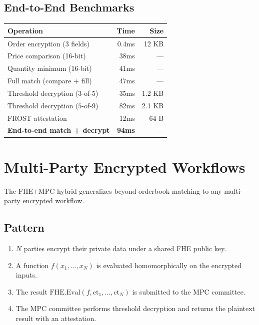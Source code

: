 \documentclass[11pt,a4paper]{article}
\begin{document}
\subsection{End-to-End Benchmarks}

\begin{center}
\begin{tabular}{lrr}
\toprule
\textbf{Operation} & \textbf{Time} & \textbf{Size} \\
\midrule
Order encryption (3 fields) & 0.4ms & 12 KB \\
Price comparison (16-bit) & 38ms & --- \\
Quantity minimum (16-bit) & 41ms & --- \\
Full match (compare + fill) & 47ms & --- \\
Threshold decryption ($3$-of-$5$) & 35ms & 1.2 KB \\
Threshold decryption ($5$-of-$9$) & 82ms & 2.1 KB \\
FROST attestation & 12ms & 64 B \\
\midrule
\textbf{End-to-end match + decrypt} & \textbf{94ms} & --- \\
\bottomrule
\end{tabular}
\end{center}

\section{Multi-Party Encrypted Workflows}

The FHE+MPC hybrid generalizes beyond orderbook matching to any multi-party encrypted workflow.

\subsection{Pattern}

\begin{enumerate}[leftmargin=2em]
\item $N$ parties encrypt their private data under a shared FHE public key.
\item A function $f(x_1, \ldots, x_N)$ is evaluated homomorphically on the encrypted inputs.
\item The result $\text{FHE.Eval}(f, \text{ct}_1, \ldots, \text{ct}_N)$ is submitted to the MPC committee.
\item The MPC committee performs threshold decryption and returns the plaintext result with an attestation.
\end{enumerate}
\end{document}
